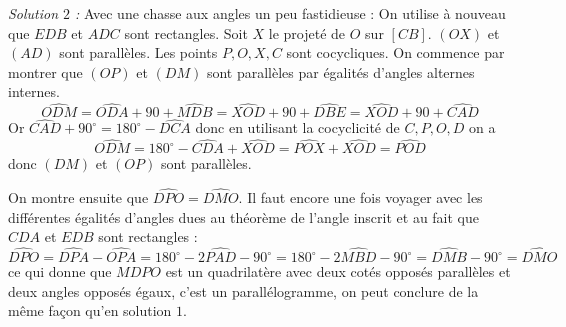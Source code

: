 \begin{sol}
\bigskip

\textit{Solution $2$ :} Avec une chasse aux angles un peu fastidieuse :
On utilise à nouveau que $EDB$ et $ADC$ sont rectangles. Soit $X$ le projeté de $O$ sur $[CB]$. $(OX)$ et $(AD)$ sont parallèles. Les points $P,O,X,C$ sont cocycliques. On commence par montrer que $(OP)$ et $(DM)$ sont parallèles par égalités d'angles alternes internes.
$$\widehat{ODM}=\widehat{ODA}+90+\widehat{MDB}=\widehat{XOD}+90+\widehat{DBE}=\widehat{XOD}+90+\widehat{CAD}$$
Or $\widehat{CAD}+90^\circ = 180^\circ - \widehat{DCA}$ donc en utilisant la cocyclicité de $C,P,O,D$ on a
$$\widehat{ODM} = 180^\circ - \widehat{CDA}+\widehat{XOD}=\widehat{POX}+\widehat{XOD}=\widehat{POD}$$ donc $(DM)$ et $(OP)$ sont parallèles.

On montre ensuite que $\widehat{DPO}=\widehat{DMO}$. Il faut encore une fois voyager avec les différentes égalités d'angles dues au théorème de l'angle inscrit et au fait que $CDA$ et $EDB$ sont rectangles :
$$\widehat{DPO}=\widehat{DPA}-\widehat{OPA}= 180^\circ - 2\widehat{PAD}-90^\circ = 180^\circ - 2\widehat{MBD}-90^\circ = \widehat{DMB}-90^\circ = \widehat{DMO}$$
ce qui donne que $MDPO$ est un quadrilatère avec deux cotés opposés parallèles et deux angles opposés égaux, c'est un parallélogramme, on peut conclure de la même façon qu'en solution $1$.
\end{sol}


